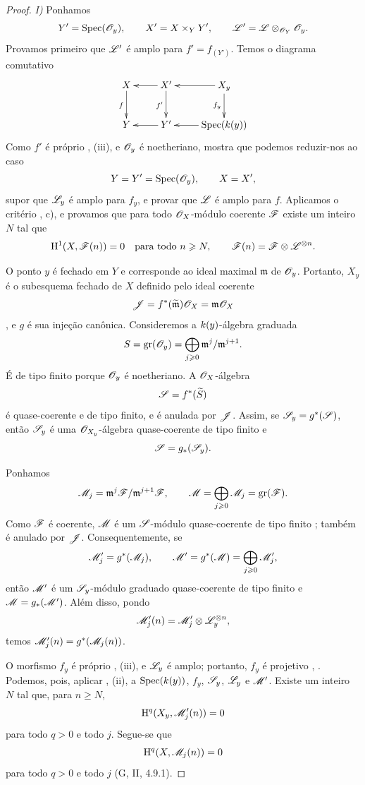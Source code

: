 \begin{proof}

\noindent\textit{I)} Ponhamos
\[
  Y'=\operatorname{Spec}(\mathscr{O}_y),\qquad
  X'=X\times_Y Y',\qquad
  \mathscr{L}'=\mathscr{L}\otimes_{\mathscr{O}_Y}\mathscr{O}_y.
\]
Provamos primeiro que $\mathscr{L}'$ é amplo para $f'=f_{(Y')}$. Temos
o diagrama comutativo
\[
  \xymatrix{
    X\ar[d]_f
      &
    X'\ar[l]\ar[d]_{f'}
      &
    X_y\ar[l]\ar[d]_{f_y}
    \\
    Y
      &
    Y'\ar[l]
      &
    \Spec(\kres(y))\ar[l].
  }
\]
Como $f'$ é próprio , (iii), e $\mathscr{O}_y$ é
noetheriano,  mostra que podemos reduzir-nos ao caso
\[
  Y=Y'=\operatorname{Spec}(\mathscr{O}_y),\qquad X=X',
\]
supor que $\mathscr{L}_y$ é amplo para $f_y$, e provar que $\mathscr{L}$
é amplo para $f$. Aplicamos o critério
, c), e provamos que para todo
$\mathscr{O}_X$-módulo coerente $\mathscr{F}$ existe um inteiro $N$ tal que
\[
  \mathrm{H}^1(X,\mathscr{F}(n))=0
  \quad\text{para todo }n\geqslant N,
  \qquad
  \mathscr{F}(n)=\mathscr{F}\otimes\mathscr{L}^{\otimes n}.
\]

O ponto $y$ é fechado em $Y$ e corresponde ao ideal maximal
$\mathfrak m$ de $\mathscr{O}_y$. Portanto, $X_y$ é o
subesquema fechado de $X$ definido pelo ideal coerente
\[
  \mathscr{J}
  =
  f^*(\widetilde{\mathfrak m})\mathscr{O}_X
  =
  \mathfrak m\mathscr{O}_X
\]
, e $g$ é sua injeção canônica. Consideremos
a $k(y)$-álgebra graduada
\[
  S=\operatorname{gr}(\mathscr{O}_y)
   =\bigoplus_{j\geqslant0}
      \mathfrak m^j/\mathfrak m^{j+1}.
\]
É de tipo finito porque $\mathscr{O}_y$ é noetheriano. A
$\mathscr{O}_X$-álgebra
\[
  \mathscr{S}=f^*(\widetilde S)
\]
é quase-coerente e de tipo finito, e é anulada por
$\mathscr{J}$. Assim, se $\mathscr{S}_y=g^*(\mathscr{S})$, então $\mathscr{S}_y$ é uma
$\mathscr{O}_{X_y}$-álgebra quase-coerente de tipo finito e
\[
  \mathscr{S}=g_*(\mathscr{S}_y).
\]

Ponhamos
\[
  \mathscr{M}_j
  =
  \mathfrak m^j\mathscr{F}/\mathfrak m^{j+1}\mathscr{F},
  \qquad
  \mathscr{M}
  =
  \bigoplus_{j\geqslant0}\mathscr{M}_j
  =
  \operatorname{gr}(\mathscr{F}).
\]
Como $\mathscr{F}$ é coerente, $\mathscr{M}$ é um
$\mathscr{S}$-módulo quase-coerente de tipo finito ; também é
anulado por $\mathscr{J}$. Consequentemente, se
\[
  \mathscr{M}'_j=g^*(\mathscr{M}_j),
  \qquad
  \mathscr{M}'=g^*(\mathscr{M})
    =\bigoplus_{j\geqslant0}\mathscr{M}'_j,
\]
então $\mathscr{M}'$ é um $\mathscr{S}_y$-módulo graduado quase-coerente de
tipo finito e $\mathscr{M}=g_*(\mathscr{M}')$. Além disso, pondo
\[
  \mathscr{M}'_j(n)
  =
  \mathscr{M}'_j\otimes\mathscr{L}_y^{\otimes n},
\]
temos $\mathscr{M}'_j(n)=g^*(\mathscr{M}_j(n))$.

O morfismo $f_y$ é próprio , (iii), e
$\mathscr{L}_y$ é amplo; portanto, $f_y$ é projetivo
, . Podemos, pois, aplicar
, (ii), a
$\operatorname{Spec}(k(y))$, $f_y$, $\mathscr{S}_y$, $\mathscr{L}_y$ e $\mathscr{M}'$.
Existe um inteiro $N$ tal que, para $n\geq N$,
\[
  \mathrm{H}^q(X_y,\mathscr{M}'_j(n))=0
\]
para todo $q>0$ e todo $j$. Segue-se que
\[
  \mathrm{H}^q(X,\mathscr{M}_j(n))=0
\]
para todo $q>0$ e todo $j$ (G, II, 4.9.1).


\end{proof}
